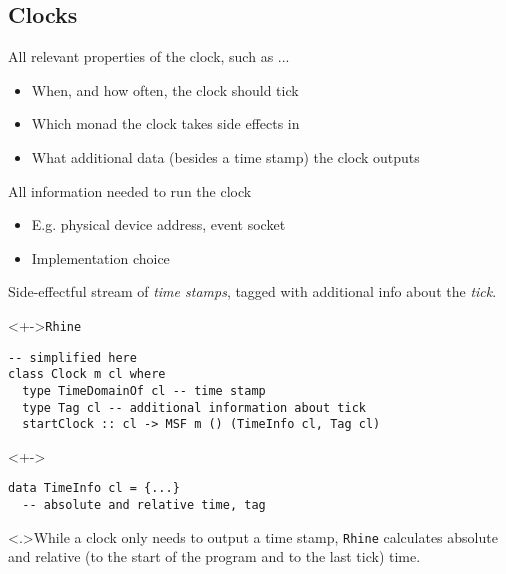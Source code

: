 \documentclass[handout]{enigtex-beamer-base}
\begin{document}
\subsection{Clocks}

\begin{frame}[fragile]
	\begin{description}[<+->]
		\item[Clock type] All relevant properties of the clock, such as ...
		\begin{itemize}[<+->]
			\item When, and how often, the clock should tick
			\item Which monad the clock takes side effects in
			\item What additional data (besides a time stamp) the clock outputs
		\end{itemize}
		\item[Clock value] All information needed to run the clock
		\begin{itemize}[<+->]
			\item E.g. physical device address, event socket
			\item Implementation choice
		\end{itemize}
		\item[Running clock] Side-effectful stream of \emph{time stamps}, tagged with additional info about the \emph{tick}.
	\end{description}
\end{frame}


\begin{frame}[fragile]
\begin{block}<+->{\texttt{Rhine}}
\begin{verbatim}
-- simplified here
class Clock m cl where
  type TimeDomainOf cl -- time stamp
  type Tag cl -- additional information about tick
  startClock :: cl -> MSF m () (TimeInfo cl, Tag cl)
\end{verbatim}
\end{block}

\begin{block}<+->{}
\begin{verbatim}
data TimeInfo cl = {...}
  -- absolute and relative time, tag
\end{verbatim}
\end{block}
\note<.>{While a clock only needs to output a time stamp,
\texttt{Rhine} calculates absolute and relative (to the start of the program and to the last tick) time.}
\end{frame}
\end{document}
